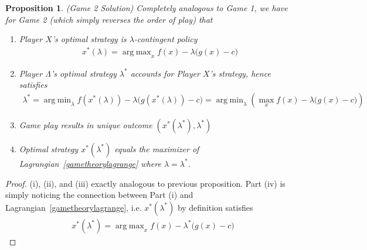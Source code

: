\documentclass[12pt]{book}
\numberwithin{equation}{section} %
\theoremstyle{plain}
\newtheorem{prop}[thm]{Proposition}
\theoremstyle{definition}
\theoremstyle{remark}
\DeclareMathOperator*{\argmin}{arg\;min}
\DeclareMathOperator*{\argmax}{arg\;max}
\begin{document}
\begin{prop}
\emph{(Game 2 Solution)}
\label{prop:game2}
Completely analogous to Game 1, we have for Game 2 (which simply
reverses the order of play) that
\begin{enumerate}[label=\emph{(\roman*)}]
  \item Player $X$'s optimal strategy is $\lambda$-contingent policy
    \begin{align*}
      x^*(\lambda) = \argmax_x f(x)-\lambda\big(g(x)-c\big)
    \end{align*}
  \item
    Player $\Lambda$'s optimal strategy $\lambda^*$ accounts for Player
    $X$'s strategy, hence satisfies
    \begin{align*}
      \lambda^*
      = \argmin_\lambda f(x^*(\lambda))-\lambda \big(g(x^*(\lambda))-c\big)
      =
      \argmin_\lambda \left(
      \max_x f(x)-\lambda\big(g(x)-c\big)
      \right)
    \end{align*}
  \item Game play results in unique outcome
    $(x^*(\lambda^*),\lambda^*)$
  \item Optimal strategy $x^*(\lambda^*)$ equals the maximizer
    of Lagrangian~\ref{gametheorylagrange} where $\lambda=\lambda^*$.
\end{enumerate}
\end{prop}
\begin{proof}
(i), (ii), and (iii) exactly analogous to previous proposition.
Part (iv) is simply noticing the connection between Part (i) and
Lagrangian~\ref{gametheorylagrange}, i.e.
$x^*(\lambda^*)$ by definition satisfies
\begin{align*}
  x^*(\lambda^*)
  =
  \argmax_x f(x) - \lambda^*\big(g(x)-c\big)
\end{align*}
\end{proof}
\end{document}
